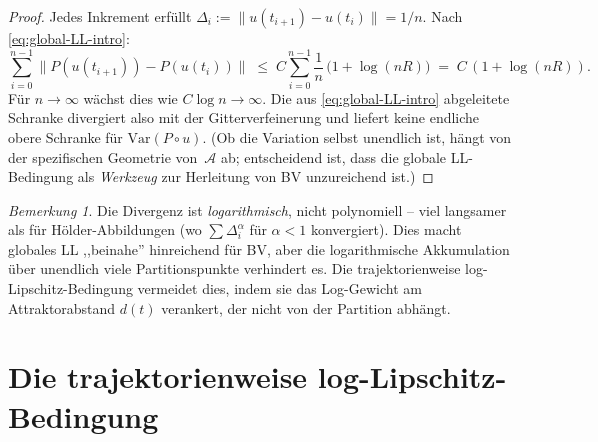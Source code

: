 \documentclass[12pt,a4paper]{article}
\theoremstyle{definition}
\theoremstyle{plain}
\theoremstyle{remark}
\newtheorem{remark}[definition]{Bemerkung}
\newcommand{\Var}{\mathrm{Var}}
\begin{document}
\begin{proof}
Jedes Inkrement erfüllt $\Delta_i := \|u(t_{i+1}) - u(t_i)\| = 1/n$.
Nach \eqref{eq:global-LL-intro}:
\[
  \sum_{i=0}^{n-1} \|P(u(t_{i+1})) - P(u(t_i))\|
  \;\le\;
  C \sum_{i=0}^{n-1} \frac{1}{n}\,
  \bigl(1 + \log(nR)\bigr)
  \;=\;
  C\,(1 + \log(nR)).
\]
Für $n \to \infty$ wächst dies wie $C\log n \to \infty$.
Die aus \eqref{eq:global-LL-intro} abgeleitete Schranke divergiert
also mit der Gitterverfeinerung und liefert keine endliche obere
Schranke für $\Var(P \circ u)$.  (Ob die Variation selbst unendlich
ist, hängt von der spezifischen Geometrie von~$\mathcal{A}$ ab;
entscheidend ist, dass die globale LL-Bedingung als \emph{Werkzeug}
zur Herleitung von BV unzureichend ist.)
\end{proof}

\begin{remark}
Die Divergenz ist \emph{logarithmisch}, nicht polynomiell -- viel
langsamer als für Hölder-Abbildungen (wo $\sum \Delta_i^\alpha$
für $\alpha < 1$ konvergiert).  Dies macht globales LL ,,beinahe''
hinreichend für BV, aber die logarithmische Akkumulation über
unendlich viele Partitionspunkte verhindert es.  Die trajektorienweise
log-Lipschitz-Bedingung vermeidet dies, indem sie das Log-Gewicht am
Attraktorabstand $d(t)$ verankert, der nicht von der Partition
abhängt.
\end{remark}


\section{Die trajektorienweise log-Lipschitz-Bedingung}
\label{sec:TLL}
\end{document}
